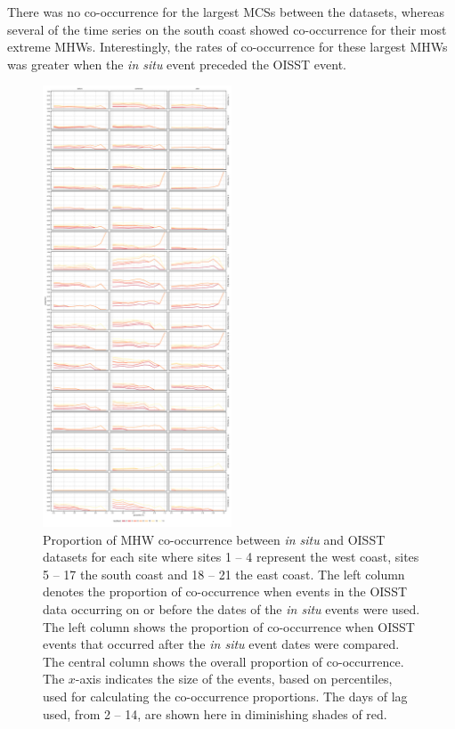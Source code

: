 \documentclass[a4paper,10pt,review]{elsarticle}
\begin{document}
There was no co-occurrence for the largest MCSs between the datasets, whereas several of the time series on the south coast showed co-occurrence for their most extreme MHWs. Interestingly, the rates of co-occurrence for these largest MHWs was greater when the \emph{in situ} event preceded the OISST event.

\begin{figure}
\centering \includegraphics[width=0.5\textwidth]{figure4.pdf}
\caption{Proportion of MHW co-occurrence between \emph{in situ} and OISST datasets for each site where sites 1 -- 4 represent the west coast, sites 5 -- 17 the south coast and 18 -- 21 the east coast. The left column denotes the proportion of co-occurrence when events in the OISST data occurring on or before the dates of the \emph{in situ} events were used. The left column shows the proportion of co-occurrence when OISST events that occurred after the \emph{in situ} event dates were compared. The central column shows the overall proportion of co-occurrence. The $x$-axis indicates the size of the events, based on percentiles, used for calculating the co-occurrence proportions. The days of lag used, from 2 -- 14, are shown here in diminishing shades of red.} \label{fig:Figure4}
\end{figure}
\end{document}
